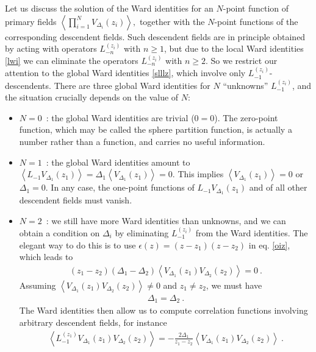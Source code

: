 \documentclass[12pt,a4paper,notitlepage]{report}
\numberwithin{equation}{section}
\theoremstyle{break}
\begin{document}
Let us discuss the solution of the Ward identities for an $N$-point function of primary fields
$
\left\langle \prod_{i=1}^N V_{\Delta_i}(z_i) \right\rangle ,
$
together with the $N$-point functions of the corresponding descendent fields.
Such descendent fields are in principle obtained by acting with operators $L_{-n}^{(z_i)}$ with $n\geq 1$, but due to the local Ward identities \eqref{lwi} we can eliminate the operators $L_{-n}^{(z_i)}$ with $n\geq 2$.
So we restrict our attention to the global Ward identities \eqref{slllz}, which involve only $L_{-1}^{(z_i)}$-descendents.
There are three global Ward identities for $N$ ``unknowns'' $L_{-1}^{(z_i)}$, and the situation crucially depends on the value of $N$:
\begin{itemize}
 \item $\boxed{N=0}$\ : the global Ward identities are trivial ($0=0$).
The zero-point function, which may be called the sphere partition function, is actually a number rather than a function, and carries no useful information.
\item $\boxed{N=1}$\ :  the global Ward identities amount to $\left\langle L_{-1}V_{\Delta_1}(z_1)\right\rangle  =\Delta_1 \left\langle V_{\Delta_1}(z_1)\right\rangle =0$.
This implies $\left\langle V_{\Delta_1}(z_1)\right\rangle=0$ or $\Delta_1=0$.
In any case, the one-point functions of $L_{-1}V_{\Delta_1}(z_1)$ and of all other descendent fields must vanish. 
\item $\boxed{N=2}$\ : we still have more Ward identities than unknowns, and we can obtain a condition on $\Delta_i$ by eliminating $L_{-1}^{(z_i)}$ from the Ward identities.
The elegant way to do this is to use $\epsilon(z)=(z-z_1)(z-z_2)$ in eq. \eqref{oiz}, which leads to 
\begin{align}
 (z_1-z_2)(\Delta_1-\Delta_2)\left\langle V_{\Delta_1}(z_1)V_{\Delta_2}(z_2)\right\rangle =0\ .
\end{align}
Assuming $\left\langle V_{\Delta_1}(z_1)V_{\Delta_2}(z_2)\right\rangle\neq 0$ and $z_1\neq z_2$, we must have 
\begin{align}
 \Delta_1 = \Delta_2 \ . 
\label{ded}
\end{align}
The Ward identities then allow us to compute correlation functions involving arbitrary descendent fields, for instance 
\begin{align}
  \left\langle L_{-1}^{(z_1)}V_{\Delta_1}(z_1)V_{\Delta_2}(z_2)\right\rangle= -\frac{2\Delta_1}{z_1-z_2}\left\langle V_{\Delta_1}(z_1)V_{\Delta_2}(z_2)\right\rangle \ .
\label{lzfz}
\end{align}

\end{itemize}
\end{document}
